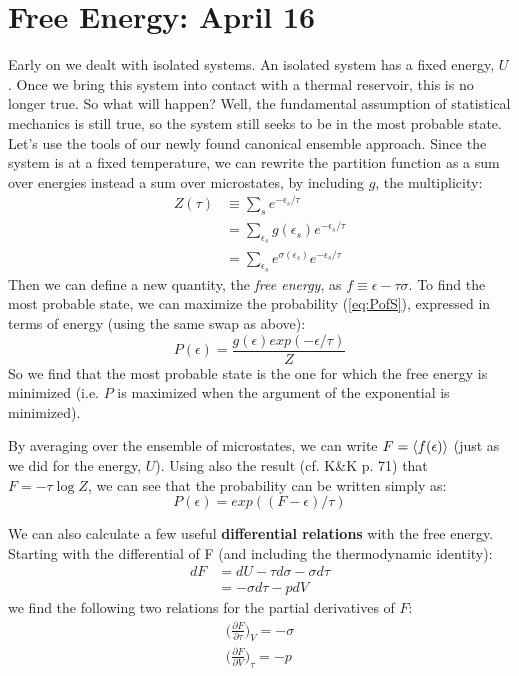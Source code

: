 \section{Free Energy: April 16}
Early on we dealt with isolated systems. An isolated system has a 
fixed energy, $U$. Once we bring this system into contact with a
thermal reservoir, this is no longer true. So what will happen?
Well, the fundamental assumption of statistical mechanics is still 
true, so the system still seeks to be in the most probable state. \\

Let's use the tools of our newly found canonical ensemble approach.
Since the system is at a fixed temperature, we can rewrite the
partition function as a sum over energies instead a sum over microstates,
by including $g$, the multiplicity:
\begin{align}
Z(\tau) &\equiv \sum_s e^{-\epsilon_s/\tau} \\
        &= \sum_{\epsilon_s} g(\epsilon_s) e^{-\epsilon_s/\tau} \\
        &= \sum_{\epsilon_s} e^{\sigma(\epsilon_s)} e^{-\epsilon_s/\tau}
\end{align}
Then we can define a new quantity, the \emph{free energy}, as
$f \equiv \epsilon - \tau \sigma$. To find the most probable state, we
can maximize the probability (\cref{eq:PofS}), expressed in terms 
of energy (using the same swap as above):
\begin{equation}
P(\epsilon) = \frac{g(\epsilon) exp(-\epsilon/\tau)}{Z}
\label{eq:Pepsilon}
\end{equation}
So we find that the most probable state is the one for which the free energy is minimized (i.e. $P$ is maximized when the argument of the exponential is minimized).

By averaging over the ensemble of microstates, we can write 
$F = \Braket{f(\epsilon)}$ (just as we did for the energy, $U$). Using also the result (cf. K\&K p. 71) that $F = -\tau \log Z$, we can see that the probability can be written simply as:
\begin{equation}
P(\epsilon) = exp((F - \epsilon)/\tau)
\end{equation}

We can also calculate a few useful \textbf{differential relations} with the free energy. Starting with the differential of F (and including the thermodynamic identity):
\begin{align}
dF &= dU - \tau d\sigma - \sigma d\tau \\
   &= -\sigma d\tau - p dV
\end{align}
we find the following two relations for the partial derivatives of $F$:
\begin{align}
\bigg(\frac{\partial F}{\partial \tau}\bigg)_V = -\sigma \\
\bigg(\frac{\partial F}{\partial V}\bigg)_\tau = -p
\label{eq:dFdX}
\end{align}

